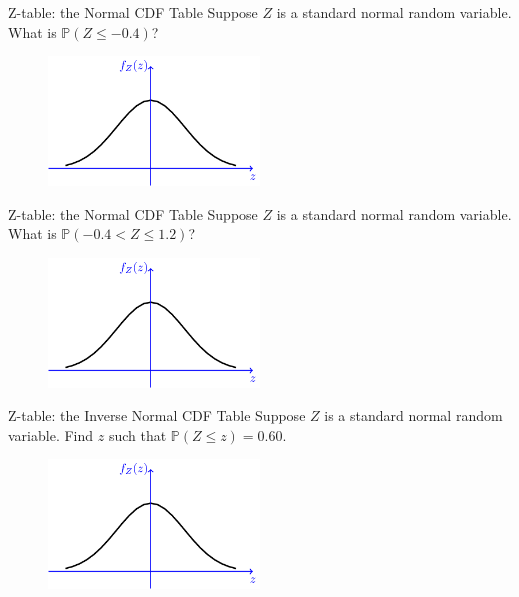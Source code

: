\documentclass{beamer}
\newcommand{\pr}{\mathbb{P}}
\begin{document}
\begin{frame}{Z-table: the Normal CDF Table}
    Suppose $Z$ is a standard normal random variable. What is $\pr (Z \leq -0.4)$?

\begin{figure}
    \includegraphics[width=0.5\textwidth]{figures/empty_pdf.png}
\end{figure}
\end{frame}

\begin{frame}{Z-table: the Normal CDF Table}
    Suppose $Z$ is a standard normal random variable. What is $\pr (-0.4 < Z \leq 1.2)$?

\begin{figure}
    \includegraphics[width=0.5\textwidth]{figures/empty_pdf.png}
\end{figure}
\end{frame}

\begin{frame}{Z-table: the Inverse Normal CDF Table}
    Suppose $Z$ is a standard normal random variable. 
    Find $z$ such that $\pr(Z \leq z) =0.60$.

\begin{figure}
    \includegraphics[width=0.5\textwidth]{figures/empty_pdf.png}
\end{figure}
\end{frame}
\end{document}
